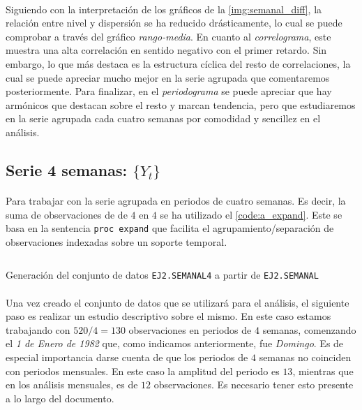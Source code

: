 \documentclass[a4paper, spanish]{article}
\begin{document}
      \paragraph{}
      Siguiendo con la interpretación de los gráficos de la \ref{img:semanal_diff}, la relación entre nivel y dispersión se ha reducido drásticamente, lo cual se puede comprobar a través del gráfico \emph{rango-media}. En cuanto al \emph{correlograma}, este muestra una alta correlación en sentido negativo con el primer retardo. Sin embargo, lo que más destaca es la estructura cíclica del resto de correlaciones, la cual se puede apreciar mucho mejor en la serie agrupada que comentaremos posteriormente. Para finalizar, en el \emph{periodograma} se puede apreciar que hay armónicos que destacan sobre el resto y marcan tendencia, pero que estudiaremos en la serie agrupada cada cuatro semanas por comodidad y sencillez en el análisis.

    \subsection{Serie 4 semanas: $\{Y_t\}$}
    \label{sec:weekly4_analysis}

      \paragraph{}
      Para trabajar con la serie agrupada en periodos de cuatro semanas. Es decir, la suma de observaciones de de $4$ en $4$ se ha utilizado el \autoref{code:a_expand}. Este se basa en la sentencia \texttt{proc expand} que facilita el agrupamiento/separación de observaciones indexadas sobre un soporte temporal.

      \begin{listing}[htb!]
        \centering
        \inputminted{SAS}{./res/code/a-02-expand.sas}
        \caption{Generación del conjunto de datos \texttt{EJ2.SEMANAL4} a partir de \texttt{EJ2.SEMANAL}}
        \label{code:a_expand}
      \end{listing}

      \paragraph{}
      Una vez creado el conjunto de datos que se utilizará para el análisis, el siguiente paso es realizar un estudio descriptivo sobre el mismo. En este caso estamos trabajando con $520 / 4 = 130$ observaciones en periodos de $4$ semanas, comenzando el \emph{1 de Enero de 1982} que, como indicamos anteriormente, fue \emph{Domingo}. Es de especial importancia darse cuenta de que los periodos de $4$ semanas no coinciden con periodos mensuales. En este caso la amplitud del periodo es $13$, mientras que en los análisis mensuales, es de $12$ observaciones. Es necesario tener esto presente a lo largo del documento.
\end{document}
